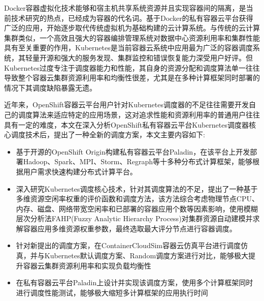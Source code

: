 \begin{cabstract}
  Docker容器虚拟化技术能够和宿主机共享系统资源并且实现容器间的隔离，是当前技术研究的热点，已经成为容器的代名词。基于Docker的私有容器云平台获得广泛的应用，开始逐步取代传统虚拟机为基础构建的云计算系统。与传统的云计算集群类似，一个高效且强大的容器编排管理系统对数据中心资源利用率和集群性能具有至关重要的作用，Kubernetes是当前容器云系统中应用最为广泛的容器调度系统，其轻量开源和强大的服务发现、集群监控和错误恢复能力深受用户好评。但Kubernetes过度专注于调度器能力和性能，其自身的资源分配和调度算法单一往往导致整个容器云集群资源利用率和均衡性很差，尤其是在多种计算框架同时部署的情况下其调度缺陷暴露无遗。

  近年来，OpenShift容器云平台用户针对Kubernetes调度器的不足往往需要开发自己的调度算法来适应特定的应用场景，这对追求性能和资源利用率的普通用户往往具有一定的难度，本文在深入分析OpenShift私有容器云平台Kubernetes调度器核心调度技术后，提出了一种全新的调度方案，本文主要内容如下:
  \begin{itemize}
  \item 基于开源的OpenShift Origin构建私有容器云平台Paladin，在该平台上开发部署Hadoop、Spark、MPI、Storm、Regraph等十多种分布式计算框架，能够根据用户需求快速构建分布式计算平台。
  \item 深入研究Kubernetes调度核心技术，针对其调度算法的不足，提出了一种基于多维资源空闲率权重的评价函数和调度方法，该方法综合考虑物理节点CPU、内存、磁盘、网络带宽空闲率和已部署的容器应用个数等因素影响，使用模糊层次分析法FAHP(Fuzzy Analytic Hierarchy Process)对集群资源自动建模并求解容器应用多维资源权重参数，最终选取最大评分节点进行容器调度。
  \item 针对新提出的调度方案，在ContainerCloudSim容器云仿真平台进行调度仿真，并与Kubernetes默认调度方案、Random调度方案进行对比，能够极大提升容器云集群资源利用率和实现负载均衡性
  \item 在私有容器云平台Paladin上设计并实现该调度方案，使用多个计算框架同时进行调度性能测试，能够极大缩短多计算框架的应用执行时间
  \end{itemize}
\end{cabstract}



